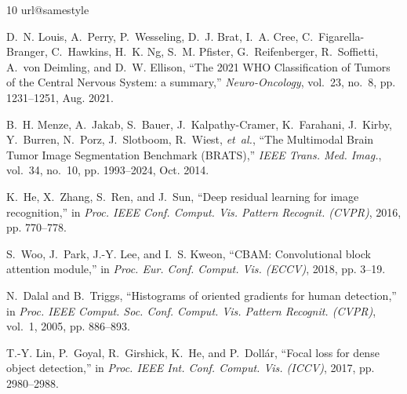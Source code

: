 \documentclass[journal,twocolumn,10pt]{IEEEtran}
\begin{document}
\begin{thebibliography}{10}
\providecommand{\url}[1]{#1}
\csname url@samestyle\endcsname
\providecommand{\newblock}{\relax}
\providecommand{\bibinfo}[2]{#2}
\providecommand{\BIBentrySTDinterwordspacing}{\spaceskip=0pt\relax}
\providecommand{\BIBentryALTinterwordstretchfactor}{4}
\providecommand{\BIBentryALTinterwordspacing}{\spaceskip=\fontdimen2\font plus
\BIBentryALTinterwordstretchfactor\fontdimen3\font minus
  \fontdimen4\font\relax}
\providecommand{\BIBforeignlanguage}[2]{{%
\expandafter\ifx\csname l@#1\endcsname\relax
\typeout{** WARNING: IEEEtran.bst: No hyphenation pattern has been}%
\typeout{** loaded for the language `#1'. Using the pattern for}%
\typeout{** the default language instead.}%
\else
\language=\csname l@#1\endcsname
\fi
#2}}
\providecommand{\BIBdecl}{\relax}
\BIBdecl

D.~N. Louis, A.~Perry, P.~Wesseling, D.~J. Brat, I.~A. Cree, C.~Figarella-Branger, C.~Hawkins, H.~K. Ng, S.~M. Pfister, G.~Reifenberger, R.~Soffietti, A.~von Deimling, and D.~W. Ellison, ``The 2021 WHO Classification of Tumors of the Central Nervous System: a summary,'' \emph{Neuro-Oncology}, vol.~23, no.~8, pp. 1231--1251, Aug. 2021.

B.~H. Menze, A.~Jakab, S.~Bauer, J.~Kalpathy-Cramer, K.~Farahani, J.~Kirby, Y.~Burren, N.~Porz, J.~Slotboom, R.~Wiest, \emph{et~al.}, ``The Multimodal Brain Tumor Image Segmentation Benchmark (BRATS),'' \emph{IEEE Trans. Med. Imag.}, vol.~34, no.~10, pp. 1993--2024, Oct. 2014.

K.~He, X.~Zhang, S.~Ren, and J.~Sun, ``Deep residual learning for image recognition,'' in \emph{Proc. IEEE Conf. Comput. Vis. Pattern Recognit. (CVPR)}, 2016, pp. 770--778.

S.~Woo, J.~Park, J.-Y. Lee, and I.~S. Kweon, ``CBAM: Convolutional block attention module,'' in \emph{Proc. Eur. Conf. Comput. Vis. (ECCV)}, 2018, pp. 3--19.

N.~Dalal and B.~Triggs, ``Histograms of oriented gradients for human detection,'' in \emph{Proc. IEEE Comput. Soc. Conf. Comput. Vis. Pattern Recognit. (CVPR)}, vol.~1, 2005, pp. 886--893.

T.-Y. Lin, P.~Goyal, R.~Girshick, K.~He, and P.~Doll{\'a}r, ``Focal loss for dense object detection,'' in \emph{Proc. IEEE Int. Conf. Comput. Vis. (ICCV)}, 2017, pp. 2980--2988.


\end{thebibliography}
\end{document}
